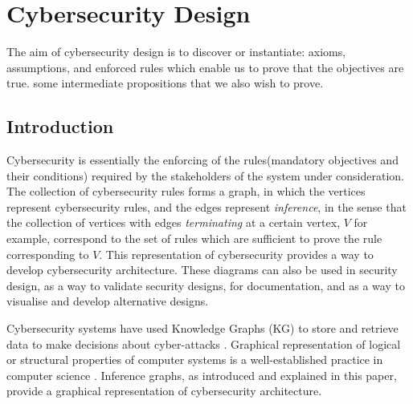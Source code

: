 \chapter{Cybersecurity Design}
The aim of cybersecurity design is to discover or instantiate:
axioms, assumptions, and enforced rules which enable us to
prove that the objectives are true.
some intermediate propositions that we also wish to prove.

\section{Introduction}\label{introsec} \thispagestyle{empty}
Cybersecurity is essentially the enforcing of the rules(mandatory objectives and their conditions) required by the stakeholders of the system under consideration.  The collection of cybersecurity rules forms a graph, in which the vertices represent cybersecurity rules, and the edges represent {\em inference}, in the sense that the collection of vertices with edges {\em terminating} at a certain vertex, $V$ for example, correspond to the set of rules which are sufficient to prove the rule corresponding to $V$. This representation of cybersecurity provides a way to develop cybersecurity architecture\cite{Rerup2018}. These diagrams can also be used in security design, as a way to validate security designs, for documentation, and as a way to visualise and develop alternative designs.

Cybersecurity systems have used Knowledge Graphs (KG) to store and  retrieve data  to make decisions about cyber-attacks 
\cite{pingle2019relext,jia2018practical, ghose2019multimodal, deng2019knowledge}. Graphical representation of logical or structural properties of computer systems is a well-established practice in computer science \cite{engelen2010integrating}. Inference graphs, as introduced and explained in this paper, provide a graphical representation of cybersecurity architecture.


